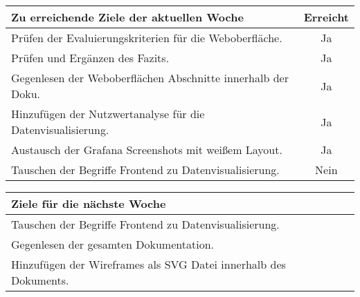 \begin{tabularx}{\textwidth}{Xc}
    \arrayrulecolor{OliveGreen}
    \toprule
    {\bfseries Zu erreichende Ziele der aktuellen Woche} & {\bfseries Erreicht} \\
    \midrule[2pt]
    Prüfen der Evaluierungskriterien für die Weboberfläche.  &Ja              \\
    \rowcolor{OliveGreen!15}
    Prüfen und Ergänzen des Fazits.                          &Ja              \\
    \rowcolor{White}
    Gegenlesen der Weboberflächen Abschnitte innerhalb der Doku.  &Ja         \\
    \rowcolor{OliveGreen!15}
    Hinzufügen der Nutzwertanalyse für die Datenvisualisierung.  &Ja          \\
    \rowcolor{White}
    Austausch der Grafana Screenshots mit weißem Layout.         &Ja          \\
    \rowcolor{White}
    Tauschen der Begriffe Frontend zu Datenvisualisierung.      &Nein         \\
    \bottomrule[2pt]
\end{tabularx}
%
\vspace{1cm}
%
\begin{tabularx}{\textwidth}{Xc}
    \arrayrulecolor{OliveGreen}
    \toprule
    {\bfseries Ziele für die nächste Woche}        &                         \\
    \midrule[2pt]
    Tauschen der Begriffe Frontend zu Datenvisualisierung.  &                 \\
    \rowcolor{OliveGreen!15}
    Gegenlesen der gesamten Dokumentation.   &                                \\
    \rowcolor{White}
    Hinzufügen der Wireframes als SVG Datei innerhalb des Dokuments. &        \\
\end{tabularx}
